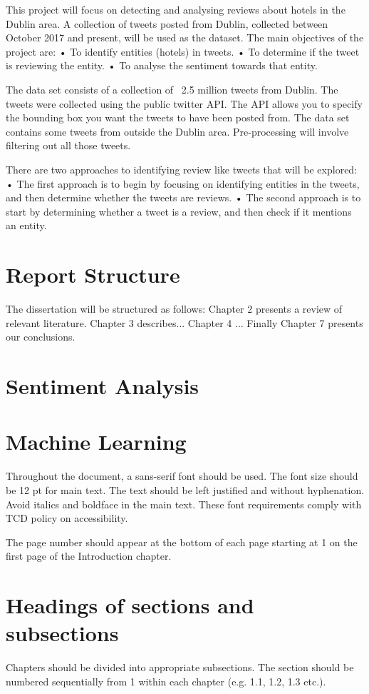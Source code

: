 This project will focus on detecting and analysing reviews about hotels in the Dublin area. A collection of tweets posted from Dublin, collected between October 2017 and present, will be used as the dataset.
The main objectives of the project are:
• To identify entities (hotels) in tweets.
• To determine if the tweet is reviewing the entity.
• To analyse the sentiment towards that entity.

The data set consists of a collection of ~2.5 million tweets from Dublin. The tweets were collected using the public twitter API. The API allows you to specify the bounding box you want the tweets to have been posted from. The data set contains some tweets from outside the Dublin area. Pre-processing will involve filtering out all those tweets.

There are two approaches to identifying review like tweets that will be explored:
• The first approach is to begin by focusing on identifying entities in the tweets, and then determine whether the tweets are reviews.
• The second approach is to start by determining whether a tweet is a review, and then check if it mentions an entity.

\section{Report Structure}
The dissertation will be structured as follows:
Chapter 2 presents a review of relevant literature. Chapter 3 describes... Chapter 4 ... Finally Chapter 7 presents our conclusions.

\section{Sentiment Analysis}

\section{Machine Learning}

Throughout the document, a sans-serif font should be used. The font size should be 12 pt for main text. The text should be left justified and without hyphenation. Avoid italics and boldface in the main text. These font requirements comply with TCD policy on accessibility.

The page number should appear at the bottom of each page starting at 1 on the first page of the Introduction chapter. 

\section{Headings of sections and subsections}
Chapters should be divided into appropriate subsections. The section should be numbered sequentially from 1 within each chapter (e.g. 1.1, 1.2, 1.3 etc.).

